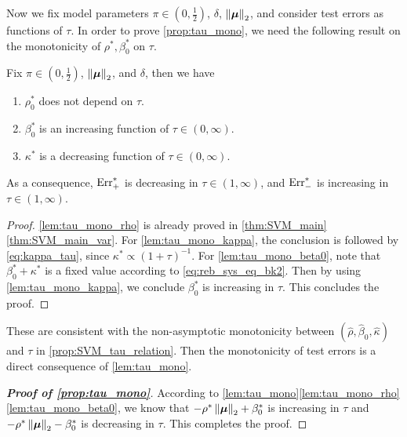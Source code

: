 Now we fix model parameters $\pi \in (0, \frac12)$, $\delta$, $\left\|{\text{\boldmath $\mu$}}\right\|_2$, and consider test errors as functions of $\tau$. In order to prove \cref{prop:tau_mono}, we need the following result on the monotonicity of $\rho^*, \beta_0^*$ on $\tau$.
\begin{lem}\label{lem:tau_mono}
    Fix $\pi \in (0, \frac12)$, $\left\|{\text{\boldmath $\mu$}}\right\|_2$, and $\delta$, then we have
    \begin{enumerate}[label=(\alph*)]
        \item \label{lem:tau_mono_rho} $\rho_0^*$ does not depend on $\tau$.
        \item \label{lem:tau_mono_beta0} $\beta_0^*$ is an increasing function of $\tau \in (0, \infty)$.
	\item \label{lem:tau_mono_kappa} $\kappa^*$ is a decreasing function of $\tau \in (0, \infty)$.
    \end{enumerate}
    As a consequence, $\mathrm{Err}^*_+$ is decreasing in $\tau \in (1, \infty)$, and $\mathrm{Err}^*_-$ is increasing in $\tau \in (1, \infty)$.
\end{lem}
\begin{proof}
    \ref{lem:tau_mono_rho} is already proved in \cref{thm:SVM_main}\ref{thm:SVM_main_var}. For \ref{lem:tau_mono_kappa}, the conclusion is followed by \cref{eq:kappa_tau}, since $\kappa^* \propto (1 + \tau)^{-1}$. For \ref{lem:tau_mono_beta0}, note that $\beta_0^* + \kappa^*$ is a fixed value according to \cref{eq:reb_sys_eq_bk2}. Then by using \ref{lem:tau_mono_kappa}, we conclude $\beta_0^*$ is increasing in $\tau$. This concludes the proof.
\end{proof}

These are consistent with the non-asymptotic monotonicity between $(\hat\rho, \hat\beta_0, \hat\kappa)$ and $\tau$ in \cref{prop:SVM_tau_relation}. Then the monotonicity of test errors is a direct consequence of \cref{lem:tau_mono}.


\begin{proof}[\textbf{Proof of \cref{prop:tau_mono}}]
According to \cref{lem:tau_mono}\ref{lem:tau_mono_rho}\ref{lem:tau_mono_beta0}, we know that $-\rho^* \left\|{\text{\boldmath $\mu$}}\right\|_2 + \beta_0^*$ is increasing in $\tau$ and $-\rho^* \left\|{\text{\boldmath $\mu$}}\right\|_2 - \beta_0^*$ is decreasing in $\tau$. This completes the proof.
\end{proof}







